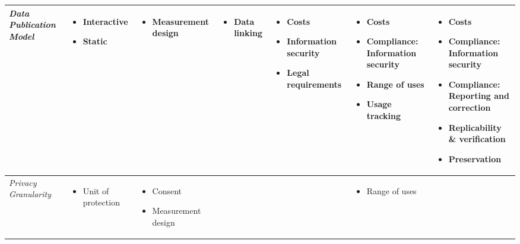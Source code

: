 \begin{sidewaystable}[p]
\begin{tabularx}{1\textwidth}{ p{0.55in} YYYYYY}
\textit{Data Publication Model} & \begin{itemize}[lifecyclesep] \item Interactive \item Static\end{itemize} & \begin{itemize}[lifecyclesep] \item Measurement design\end{itemize} & \begin{itemize}[lifecyclesep] \item Data linking\end{itemize} & \begin{itemize}[lifecyclesep] \item Costs \item Information security \item Legal requirements\end{itemize} & \begin{itemize}[lifecyclesep] \item Costs \item Compliance: Information security \item Range of uses \item Usage tracking\end{itemize} & \begin{itemize}[lifecyclesep] \item Costs \item Compliance: Information security \item Compliance: Reporting and correction \item Replicability \& verification \item Preservation\end{itemize} \\
\midrule

\textit{Privacy Granularity} & \begin{itemize}[lifecyclesep] \item Unit of protection\end{itemize} & \begin{itemize}[lifecyclesep] \item Consent \item Measurement design\end{itemize} &  &  & \begin{itemize}[lifecyclesep] \item Range of uses\end{itemize} &  \\
\midrule


\end{tabularx}
\end{sidewaystable}
